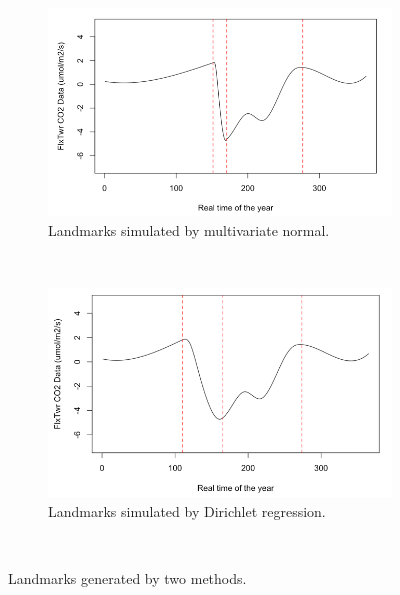 \documentclass{article}
\begin{document}
\begin{figure}[!ht]
    \centering
    \begin{subfigure}[ht]{0.45\textwidth}
        \includegraphics[width=\textwidth]{BadS2.png}
        \caption{Landmarks simulated by multivariate normal.}\label{Fig:BadS}
    \end{subfigure}
    ~ %
    \begin{subfigure}[ht]{0.45\textwidth}
        \includegraphics[width=\textwidth]{GoodS2.png}
        \caption{Landmarks simulated by Dirichlet regression.}\label{Fig:GoodS}
    \end{subfigure}
        ~ %
    \caption{Landmarks generated by two methods.}\label{Fig:landCom}
\end{figure}
\end{document}
